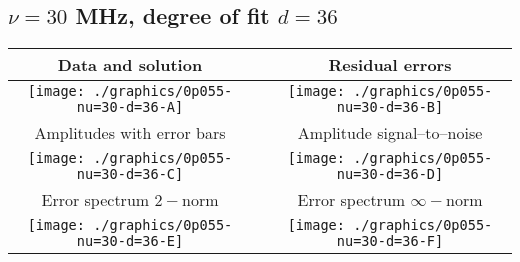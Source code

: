 

% 

\clearpage{}
\break{}

\subsection{$\nu = 30$ MHz, degree of fit $d = 36$}

\begin{table}[h]
    \begin{center}
        \begin{tabular}{ccc}
            Data and solution & \quad & Residual errors \\\hline
            \texttt{[image: ./graphics/0p055-nu=30-d=36-A]} &&
            \texttt{[image: ./graphics/0p055-nu=30-d=36-B]} \\[15pt]
            Amplitudes with error bars && Amplitude signal--to--noise \\\hline
            \texttt{[image: ./graphics/0p055-nu=30-d=36-C]} &&
            \texttt{[image: ./graphics/0p055-nu=30-d=36-D]} \\[15pt]
            Error spectrum $2-$norm && Error spectrum $\infty-$norm \\\hline
            \texttt{[image: ./graphics/0p055-nu=30-d=36-E]} &&
            \texttt{[image: ./graphics/0p055-nu=30-d=36-F]} \\[15pt]
        \end{tabular}
    \end{center}
\label{fig:elev=55, nu=30}
\end{table}



\endinput
